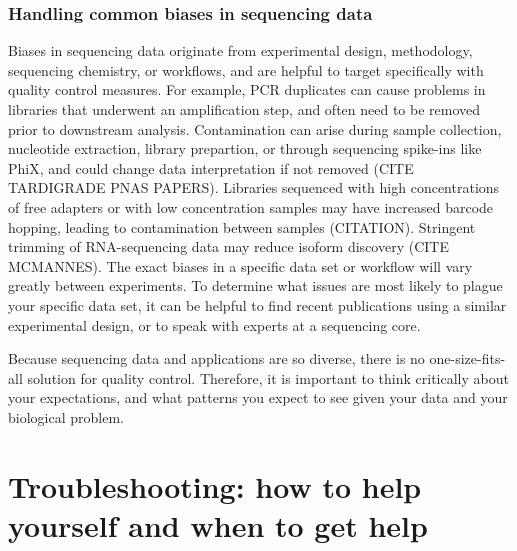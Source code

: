 \documentclass[10pt,letterpaper]{article}
\begin{document}
\subsubsection*{Handling common biases in sequencing data} %

Biases in sequencing data originate from experimental design, methodology, sequencing chemistry, or workflows, and are helpful to target specifically with quality control measures. 
For example, PCR duplicates can cause problems in libraries that underwent an amplification step, and often need to be removed prior to downstream analysis. 
Contamination can arise during sample collection, nucleotide extraction, library prepartion, or through sequencing spike-ins like PhiX, and could change data interpretation if not removed (CITE TARDIGRADE PNAS PAPERS).
Libraries sequenced with high concentrations of free adapters or with low concentration samples may have increased barcode hopping, leading to contamination between samples (CITATION). 
Stringent trimming of RNA-sequencing data may reduce isoform discovery (CITE MCMANNES). 
The exact biases in a specific data set or workflow will vary greatly between experiments. 
To determine what issues are most likely to plague your specific data set, it can be helpful to find recent publications using a similar experimental design, or to speak with experts at a sequencing core.


Because sequencing data and applications are so diverse, there is no one-size-fits-all solution for quality control. 
Therefore, it is important to think critically about your expectations, and what patterns you expect to see given your data and your biological problem. 


\section*{Troubleshooting: how to help yourself and when to get help}
\end{document}
